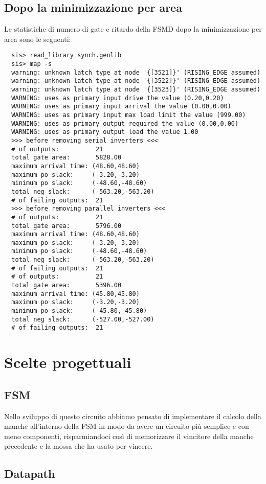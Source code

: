 \documentclass[a4paper]{article}
\begin{document}
\subsection{Dopo la minimizzazione per area}
Le statistiche di numero di gate e ritardo della FSMD dopo la minimizzazione per area sono le seguenti:
\begin{lstlisting}
  sis> read_library synch.genlib
  sis> map -s
  warning: unknown latch type at node '{[3521]}' (RISING_EDGE assumed)
  warning: unknown latch type at node '{[3522]}' (RISING_EDGE assumed)
  warning: unknown latch type at node '{[3523]}' (RISING_EDGE assumed)
  WARNING: uses as primary input drive the value (0.20,0.20)
  WARNING: uses as primary input arrival the value (0.00,0.00)
  WARNING: uses as primary input max load limit the value (999.00)
  WARNING: uses as primary output required the value (0.00,0.00)
  WARNING: uses as primary output load the value 1.00
  >>> before removing serial inverters <<<
  # of outputs:          21
  total gate area:       5828.00
  maximum arrival time: (48.60,48.60)
  maximum po slack:     (-3.20,-3.20)
  minimum po slack:     (-48.60,-48.60)
  total neg slack:      (-563.20,-563.20)
  # of failing outputs:  21
  >>> before removing parallel inverters <<<
  # of outputs:          21
  total gate area:       5796.00
  maximum arrival time: (48.60,48.60)
  maximum po slack:     (-3.20,-3.20)
  minimum po slack:     (-48.60,-48.60)
  total neg slack:      (-563.20,-563.20)
  # of failing outputs:  21
  # of outputs:          21
  total gate area:       5396.00
  maximum arrival time: (45.80,45.80)
  maximum po slack:     (-3.20,-3.20)
  minimum po slack:     (-45.80,-45.80)
  total neg slack:      (-527.00,-527.00)
  # of failing outputs:  21
\end{lstlisting}

\section{Scelte progettuali}
\subsection{FSM}
Nello sviluppo di questo circuito abbiamo pensato di implementare il calcolo della manche all'interno della
FSM in modo da avere un circuito più semplice e con meno componenti, risparmiandoci così di memorizzare il
vincitore della manche precedente e la mossa che ha usato per vincere.

\subsection{Datapath}
\end{document}

